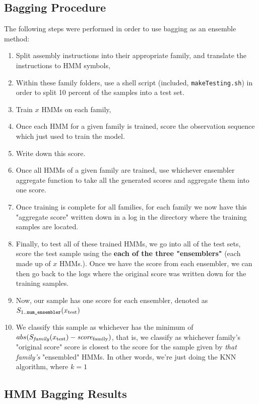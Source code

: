 \documentclass[12pt]{article}
\begin{document}
\subsection{Bagging Procedure}
  The following steps were performed in order to use bagging as an ensemble method:
  \begin{enumerate}
    \item Split assembly instructions into their appropriate family, and translate the instructions to HMM symbols,
    \item Within these family folders, use a shell script (included, \texttt{makeTesting.sh}) in order to split 10 percent of the samples into a test set.
    \item Train $x$ HMMs on each family,
    \item Once each HMM for a given family is trained, score the observation sequence which just used to train the model.
    \item Write down this score. 
    \item Once all HMMs of a given family are trained, use whichever ensembler aggregate function to take all the generated scores and aggregate them into one score. 
    \item Once training is complete for all families, for each family we now have this "aggregate score" written down in a log in the directory where the training samples are located.
    \item Finally, to test all of these trained HMMs, we go into all of the test sets, score the test sample using the \textbf{each of the three "ensemblers"} (each made up of $x$ HMMs.). Once we have the score from each ensembler, we can then go back to the logs where the original score was written down for the training samples. 
    \item Now, our sample has one score for each ensembler, denoted as $S_{1..\text{\texttt{num\_ensembler}}}(x_{\text{test}})$
    \item We classify this sample as whichever has the minimum of $abs(S_{\text{\textit{family}}}(x_{\text{test}}) - \text{\textit{score}}_\text{family} )$, that is, we classify as whichever family's "original score" score is closest to the score for the sample given by \textit{that family's} "ensembled" HMMs. In other words, we're just doing the KNN algorithm, where $k = 1$
  \end{enumerate}

\subsection{HMM Bagging Results}
\end{document}

